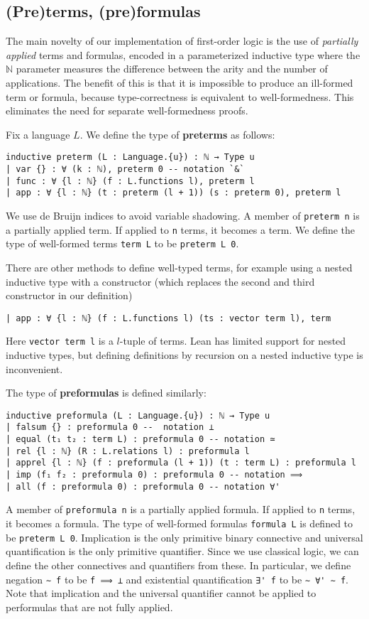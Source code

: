 \documentclass[a4paper,USenglish,cleveref, autoref]{lipics-v2019}
\newcommand{\lil}{\lstinline}
\newcommand{\N}{\mathbb{N}}
\theoremstyle{theorem}
\theoremstyle{definition}
\begin{document}
\subsection{(Pre)terms, (pre)formulas}
The main novelty of our implementation of first-order logic is the use of \emph{partially applied} terms and formulas, encoded in a parameterized inductive type where the $\N$ parameter measures the difference between the arity and the number of applications. The benefit of this is that it is impossible to produce an ill-formed term or formula, because type-correctness is equivalent to well-formedness. This eliminates the need for separate well-formedness proofs.

Fix a language $L$. We define the type of \textbf{preterms} as follows:
\begin{lstlisting}
inductive preterm (L : Language.{u}) : ℕ → Type u
| var {} : ∀ (k : ℕ), preterm 0 -- notation `&`
| func : ∀ {l : ℕ} (f : L.functions l), preterm l
| app : ∀ {l : ℕ} (t : preterm (l + 1)) (s : preterm 0), preterm l
\end{lstlisting}
We use de Bruijn indices to avoid variable shadowing.
A member of \lil{preterm n} is a partially applied term.
If applied to \lil{n} terms, it becomes a term.
We define the type of well-formed terms \lil{term L} to be \lil{preterm L 0}.

There are other methods to define well-typed terms, for example using a nested inductive type with a constructor (which replaces the second and third constructor in our definition)
\begin{lstlisting}
| app : ∀ {l : ℕ} (f : L.functions l) (ts : vector term l), term
\end{lstlisting}
Here \lil{vector term l} is a $l$-tuple of terms.
Lean has limited support for nested inductive types, but defining definitions by recursion on a nested inductive type is inconvenient.

The type of \textbf{preformulas} is defined similarly:
\begin{lstlisting}
inductive preformula (L : Language.{u}) : ℕ → Type u
| falsum {} : preformula 0 --  notation ⊥
| equal (t₁ t₂ : term L) : preformula 0 -- notation ≃
| rel {l : ℕ} (R : L.relations l) : preformula l
| apprel {l : ℕ} (f : preformula (l + 1)) (t : term L) : preformula l
| imp (f₁ f₂ : preformula 0) : preformula 0 -- notation ⟹
| all (f : preformula 0) : preformula 0 -- notation ∀'
\end{lstlisting}

A member of \lil{preformula n} is a partially applied formula.
If applied to \lil{n} terms, it becomes a formula.
The type of well-formed formulas \lil{formula L} is defined to be \lil{preterm L 0}.
Implication is the only primitive binary connective and universal quantification is the only primitive quantifier. Since we use classical logic, we can define the other connectives and quantifiers from these.
In particular, we define negation \lil{∼ f} to be \lil{f ⟹ ⊥} and existential quantification \lil{∃' f} to be \lil{∼ ∀' ∼ f}.
Note that implication and the universal quantifier cannot be applied to performulas that are not fully applied.
\end{document}
